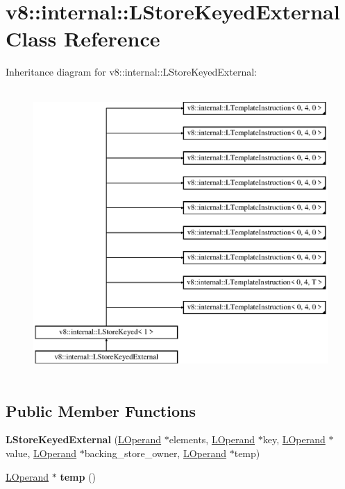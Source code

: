 \hypertarget{classv8_1_1internal_1_1_l_store_keyed_external}{}\section{v8\+:\+:internal\+:\+:L\+Store\+Keyed\+External Class Reference}
\label{classv8_1_1internal_1_1_l_store_keyed_external}
Inheritance diagram for v8\+:\+:internal\+:\+:L\+Store\+Keyed\+External\+:\begin{figure}[H]
\begin{center}
\leavevmode
\includegraphics[height=11.000000cm]{classv8_1_1internal_1_1_l_store_keyed_external}
\end{center}
\end{figure}
\subsection*{Public Member Functions}
\begin{DoxyCompactItemize}
\item 
{\bfseries L\+Store\+Keyed\+External} (\hyperlink{classv8_1_1internal_1_1_l_operand}{L\+Operand} $\ast$elements, \hyperlink{classv8_1_1internal_1_1_l_operand}{L\+Operand} $\ast$key, \hyperlink{classv8_1_1internal_1_1_l_operand}{L\+Operand} $\ast$value, \hyperlink{classv8_1_1internal_1_1_l_operand}{L\+Operand} $\ast$backing\+\_\+store\+\_\+owner, \hyperlink{classv8_1_1internal_1_1_l_operand}{L\+Operand} $\ast$temp)\hypertarget{classv8_1_1internal_1_1_l_store_keyed_external_a41cdd14c1639203fecf091104b427249}{}\label{classv8_1_1internal_1_1_l_store_keyed_external_a41cdd14c1639203fecf091104b427249}

\item 
\hyperlink{classv8_1_1internal_1_1_l_operand}{L\+Operand} $\ast$ {\bfseries temp} ()\hypertarget{classv8_1_1internal_1_1_l_store_keyed_external_a9795b49ce24db3b6b6b96d8681b642cb}{}\label{classv8_1_1internal_1_1_l_store_keyed_external_a9795b49ce24db3b6b6b96d8681b642cb}

\end{DoxyCompactItemize}
